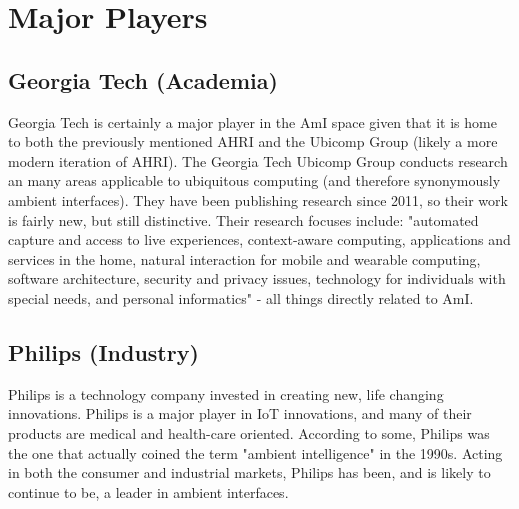 \documentclass{article}
\begin{document}
%
%
\section{Major Players}

%
\subsection{Georgia Tech (Academia)}
Georgia Tech is certainly a major player in the AmI space given that it is home to both the previously mentioned AHRI \cite{ahri} and the Ubicomp Group \cite{gtubicomp} (likely a more modern iteration of AHRI). The Georgia Tech Ubicomp Group conducts research an many areas applicable to ubiquitous computing (and therefore synonymously ambient interfaces). They have been publishing research since 2011, so their work is fairly new, but still distinctive. Their research focuses include: "automated capture and access to live experiences, context-aware computing, applications and services in the home, natural interaction for mobile and wearable computing, software architecture, security and privacy issues, technology for individuals with special needs, and personal informatics" \cite{gtubicomp} - all things directly related to AmI.

%
\subsection{Philips (Industry)}
Philips is a technology company invested in creating new, life changing innovations. Philips is a major player in IoT innovations, and many of their products are medical and health-care oriented. According to some, Philips was the one that actually coined the term "ambient intelligence" in the 1990s. Acting in both the consumer and industrial markets, Philips has been, and is likely to continue to be, a leader in ambient interfaces. \cite{philips}


%
\end{document}
